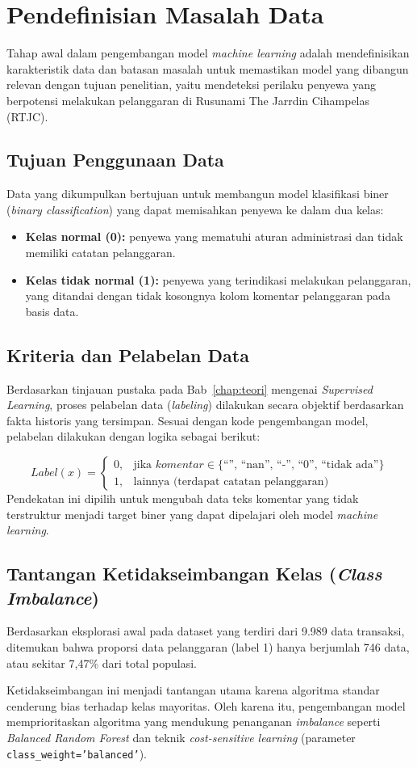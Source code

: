 \section{Pendefinisian Masalah Data}
Tahap awal dalam pengembangan model \textit{machine learning} adalah mendefinisikan karakteristik data dan batasan masalah untuk memastikan model yang dibangun relevan dengan tujuan penelitian, yaitu mendeteksi perilaku penyewa yang berpotensi melakukan pelanggaran di Rusunami The Jarrdin Cihampelas (RTJC).

\subsection{Tujuan Penggunaan Data}
Data yang dikumpulkan bertujuan untuk membangun model klasifikasi biner (\textit{binary classification}) yang dapat memisahkan penyewa ke dalam dua kelas:
\begin{itemize}
    \item \textbf{Kelas normal (0):} penyewa yang mematuhi aturan administrasi dan tidak memiliki catatan pelanggaran.
    \item \textbf{Kelas tidak normal (1):} penyewa yang terindikasi melakukan pelanggaran, yang ditandai dengan tidak kosongnya kolom komentar pelanggaran pada basis data.
\end{itemize}

\subsection{Kriteria dan Pelabelan Data}
Berdasarkan tinjauan pustaka pada Bab~\ref{chap:teori} mengenai \textit{Supervised Learning}, proses pelabelan data (\textit{labeling}) dilakukan secara objektif berdasarkan fakta historis yang tersimpan. Sesuai dengan kode pengembangan model, pelabelan dilakukan dengan logika sebagai berikut:

\[
Label(x) =
\begin{cases}
0, & \text{jika } komentar \in \{\text{``'', ``nan'', ``-'', ``0'', ``tidak ada''}\} \\
1, & \text{lainnya (terdapat catatan pelanggaran)}
\end{cases}
\]
Pendekatan ini dipilih untuk mengubah data teks komentar yang tidak terstruktur menjadi target biner yang dapat dipelajari oleh model \textit{machine learning}.

\subsection{Tantangan Ketidakseimbangan Kelas (\textit{Class Imbalance})}
Berdasarkan eksplorasi awal pada dataset yang terdiri dari 9.989 data transaksi, ditemukan bahwa proporsi data pelanggaran (label 1) hanya berjumlah 746 data, atau sekitar 7,47\% dari total populasi.

Ketidakseimbangan ini menjadi tantangan utama karena algoritma standar cenderung bias terhadap kelas mayoritas. Oleh karena itu, pengembangan model memprioritaskan algoritma yang mendukung penanganan \textit{imbalance} seperti \textit{Balanced Random Forest} dan teknik \textit{cost-sensitive learning} (parameter \texttt{class\_weight='balanced'}).